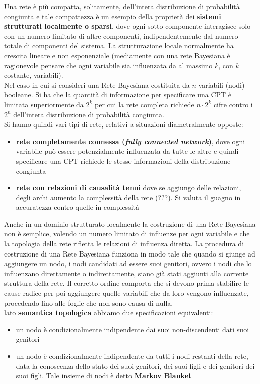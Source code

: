 \documentclass[a4paper,12pt, oneside]{book}
\begin{document}
Una rete è più compatta, solitamente, dell'intera distribuzione di probabilità
congiunta e tale compattezza è un esempio della proprietà dei \textbf{sistemi
  strutturati localmente o sparsi}, dove ogni sotto-componente interagisce solo
con un numero limitato di 
altre componenti, indipendentemente dal numero totale di componenti del
sistema. La strutturazione locale normalmente ha crescita lineare e non
esponenziale (mediamente con una rete Bayesiana è ragionevole pensare che ogni
variabile sia influenzata da al massimo $k$, con $k$ costante, variabili).\\  
Nel caso in cui si consideri una Rete Bayesiana costituita da $n$ variabili
(nodi) booleane. Si ha che la quantità di informazione per specificare una CPT è
limitata superiormente da $2^k$ per cui la rete completa richiede $n\cdot 2^k$
cifre contro i $2^n$ dell'intera distribuzione di probabilità congiunta.\\
Si hanno quindi vari tipi di rete, relativi a situazioni diametralmente opposte:
\begin{itemize}
  \item \textbf{rete completamente connessa (\textit{fully connected network})},
  dove ogni variabile può essere potenzialmente influenzata da tutte le altre e
  quindi specificare una CPT richiede le stesse informazioni della distribuzione
  congiunta
  \item \textbf{rete con relazioni di causalità tenui} dove se aggiungo delle
  relazioni, degli archi aumento la complessità della rete (???). Si valuta il
  guagno in accuratezza contro quelle in complessità
\end{itemize}
Anche in un dominio strutturato localmente la costruzione di una Rete Bayesiana
non è semplice, volendo un numero limitato di influenze per ogni variabile e che
la topologia della rete rifletta le relazioni di influenza diretta. La procedura
di costruzione di una Rete Bayesiana funziona in modo tale che quando si giunge
ad aggiungere un nodo, i nodi candidati ad essere suoi genitori, ovvero i nodi
che lo influenzano direttamente o indirettamente, siano già stati aggiunti alla
corrente struttura della rete. Il corretto ordine comporta che si devono prima
stabilire le cause radice per poi aggiungere quelle variabili che da loro
vengono influenzate, procedendo fino alle foglie che non sono causa di nulla. \\
lato \textbf{semantica topologica} abbiamo due specificazioni equivalenti:
\begin{itemize}
  \item un nodo è condizionalmente indipendente dai suoi non-discendenti dati
  suoi genitori
  \item un nodo è condizionalmente indipendente da tutti i nodi restanti della
  rete, data la conoscenza dello stato dei suoi genitori, dei suoi figli e dei
  genitori dei suoi figli. Tale insieme di nodi è detto \textbf{Markov Blanket}
\end{itemize}
\end{document}
